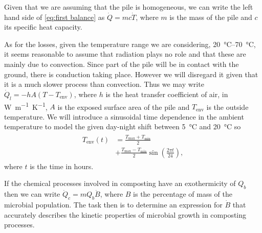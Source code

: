 \documentclass[12pt, a4paper, twocolumn, twoside]{article}
\numberwithin{table}{section}
\numberwithin{figure}{section}
\numberwithin{equation}{section}
\begin{document}
Given that we are assuming that the pile is homogeneous, we can write the left hand side of \cref{eq:first balance} as \( \dot{Q} = mc\dot{T} \), where \( m \) is the mass of the pile and \( c \) its specific heat capacity. 

As for the losses, given the temperature range we are considering, \SIrange{20}{70}{\celsius}, it seems reasonable to assume that radiation plays no role and that these are mainly due to convection. Since part of the pile will be in contact with the ground, there is conduction taking place. However we will disregard it given that it is a much slower process than convection.  Thus we may write \( \dot{Q}_l = -hA\left(T - T_\text{env}\right) \), where \( h \) is the heat transfer coefficient of air, in \si{W.m^{-1}.K^{-1}}, \( A \) is the exposed surface area of the pile and \( T_\text{env} \) is the outside temperature. We will introduce a sinusoidal time dependence in the ambient temperature to model the given day-night shift between \SI{5}{\celsius} and \SI{20}{\celsius} so 
\begin{align} \label{eq:temp ambient}
	\begin{aligned}
		T_\text{env}(t)  & = \frac{T_\text{max} + T_\text{min}}{2} \\
									 	 & + \frac{T_\text{max} - T_\text{min}}{2} \sin{\left(\frac{2\pi t}{24}\right)},
	\end{aligned}
\end{align}
where \( t \) is the time in hours. 

If the chemical processes involved in composting have an exothermicity of \( Q_b \) then we can write	\( \dot{Q}_c = mQ_b \dot{B} \), where \( B \) is the percentage of mass of the microbial population. The task then is to determine an expression for \( \dot{B} \) that accurately describes the kinetic properties of microbial growth in composting processes.
\end{document}
